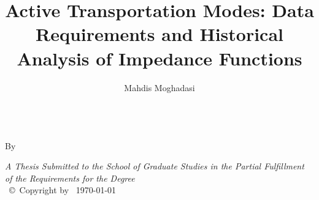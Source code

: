 \documentclass[
11pt, %
oneside, %
english, %
singlespacing, %
]{macthesis} %
\title{Active Transportation Modes: Data Requirements and Historical Analysis of Impedance Functions}
\author{Mahdis Moghadasi}
\date{}
\def\blankpage{%
      \clearpage%
      \thispagestyle{empty}%
      \addtocounter{page}{-1}%
      \null%
      \clearpage}
\begin{document}
\sloppy

\frontmatter %

\pagestyle{plain} %

\vspace{6cm}
\begin{center}
\ttitle
\end{center}
\clearpage

\begin{center}

\vfill
\textsc{\Large \ttitle} \\

\vfill
{By \authorname\, \bdeg }


 \vfill
{\large \textit{A Thesis Submitted to the School of Graduate Studies in the Partial Fulfillment of the Requirements for the Degree \degreename}}\\

\vfill
{\large \univname\, \copyright\, Copyright by \authorname\, \today}\\[4cm] %

\end{center}
\blankpage
\clearpage



\blankpage
\clearpage

\end{document}
